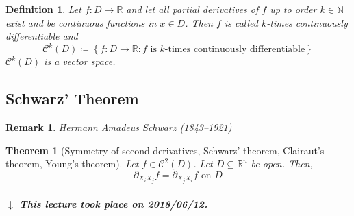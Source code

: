 \documentclass{article}
\newtheorem{theorem}{Theorem}  \numberwithin{theorem}{section}
\newtheorem{definition}{Definition}  \numberwithin{definition}{section}
\newtheorem{remark}{Remark}  \numberwithin{remark}{section}
\newcommand{\set}[1]{\left\{#1\right\}}
\newcommand{\dateref}[1]{%
  \begin{mdframed}[backgroundcolor=gray!10,innerbottommargin=0pt,innertopmargin=0pt]
    \paragraph{\textit{$\downarrow$ This lecture took place on #1.}}%
  \end{mdframed}%
}
\begin{document}
\begin{definition}
  Let $f: D \to \mathbb R$ and let all partial derivatives of $f$ up to order $k \in \mathbb N$ exist and be continuous functions in $x \in D$.
  Then $f$ is called \emph{$k$-times continuously differentiable} and
  \[ \mathcal C^k(D) \coloneqq \set{f: D \to \mathbb R: f \text{ is $k$-times continuously differentiable}} \]
  $\mathcal C^k(D)$ is a vector space.
\end{definition}

\subsection{Schwarz' Theorem}

\begin{remark}
  Hermann Amadeus Schwarz (1843--1921)
\end{remark}

\begin{theorem}[Symmetry of second derivatives, Schwarz' theorem, Clairaut's theorem, Young's theorem] %
  Let $f \in \mathcal C^2(D)$. Let $D \subseteq \mathbb R^n$ be open. Then,
  \[ \partial_{X_i X_j} f = \partial_{X_j X_i} f \text{ on } D \]
\end{theorem}

\dateref{2018/06/12}
\end{document}
